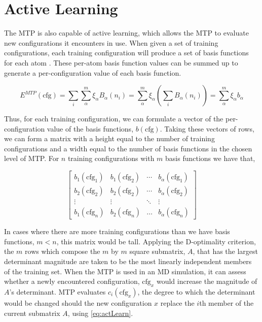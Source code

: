 \documentclass[9pt,twocolumn,twoside]{opticajnl}
\begin{document}
\section{Active Learning}
The MTP is also capable of active learning, which allows the MTP to evaluate new configurations it encounters in use. When given a set of training configurations, each training configuration will produce a set of basis functions for each atom \cite{mlip}. These per-atom basis function values can be summed up to generate a per-configuration value of each basis function.

\begin{equation}
  E^{MTP}(\textrm{cfg}) = \sum_i \sum_\alpha^m \xi_\alpha B_\alpha (n_i) = \sum_\alpha^m \xi_\alpha (\sum_i  B_\alpha (n_i)) = \sum_\alpha^m \xi_\alpha b_\alpha
\end{equation}

Thus, for each training configuration, we can formulate a vector of the per-configuration value of the basis functions, $b(\textrm{cfg})$. Taking these vectors of rows, we can form a matrix with a height equal to the number of training configurations and a width equal to the number of basis functions in the chosen level of MTP.  For $n$ training configurations with $m$ basis functions we have that,

\[
\begin{bmatrix} 
    b_{1}(\textrm{cfg}_1)  & b_{1}(\textrm{cfg}_2)  & \cdots & b_{\alpha}(\textrm{cfg}_1) \\
    b_{2}(\textrm{cfg}_2)  & b_{2}(\textrm{cfg}_2)  & \cdots & b_{\alpha}(\textrm{cfg}_2) \\
    \vdots & \vdots & \ddots & \vdots \\ 
    b_{1}(\textrm{cfg}_n)       & b_{2}(\textrm{cfg}_n)  & \dots & b_{\alpha}(\textrm{cfg}_n) 
\end{bmatrix}
\]


In cases where there are more training configurations than we have basis functions, $m < n$, this matrix would be tall. Applying the D-optimality criterion, the $m$ rows which compose the $m$ by $m$ square submatrix, $A$, that has the largest determinant magnitude are taken to be the most linearly independent members of the training set. When the MTP is used in an MD simulation, it can assess whether a newly encountered configuration, $\textrm{cfg}_x$ would increase the magnitude of $A$'s determinant. MTP evaluates $c_i(\textrm{cfg}_x)$, the degree to which the determinant would be changed should the new configuration $x$ replace the $i$th member of the current submatrix $A$, using \ref{eq:actLearn}.
\end{document}

